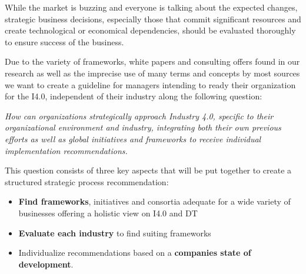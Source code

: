 While the market is buzzing and everyone is talking about the expected changes, strategic business decisions, especially those that commit significant resources and create technological or economical dependencies, should be evaluated thoroughly to ensure success of the business.

Due to the variety of frameworks, white papers and consulting offers found in our research as well as the imprecise use of many terms and concepts by most sources we want to create a guideline for managers intending to ready their organization for the \acl{I4.0}, independent of their industry along the following question:

\emph{How can organizations strategically approach Industry 4.0, specific to their organizational environment and industry, integrating both their own previous efforts as well as global initiatives and frameworks to receive individual implementation recommendations.}

This question consists of three key aspects that will be put together to create a structured strategic process recommendation:
\begin{itemize}
    \item \textbf{Find frameworks}, initiatives and consortia adequate for a wide variety of businesses offering a holistic view on \ac{I4.0} and \ac{DT}
    \item \textbf{Evaluate each industry} to find suiting frameworks
    \item Individualize recommendations based on a \textbf{companies state of development}.
\end{itemize}

